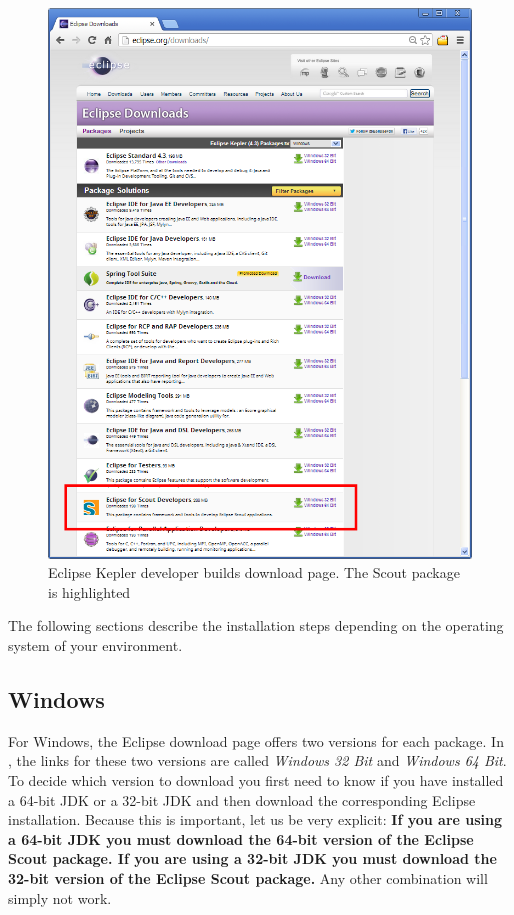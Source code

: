 \documentclass[a4paper,10pt,twoside]{book}
\begin{document}
\begin{figure}
\includegraphics[width=15cm]{scout_download.png}
\caption{Eclipse Kepler developer builds download page. The Scout package is highlighted}
\end{figure}

The following sections describe the installation steps depending on the operating system of your environment.

\subsection{Windows}

For Windows, the Eclipse download page offers two versions for each package.
In , the links for these two versions are called \textit{Windows 32 Bit} and \textit{Windows 64 Bit}.
To decide which version to download you first need to know if you have installed a 64-bit JDK or a 32-bit JDK and then download the corresponding Eclipse installation.
Because this is important, let us be very explicit: \textbf{If you are using a 64-bit JDK you must download the 64-bit version of the Eclipse Scout package. If you are using a 32-bit JDK you must download the 32-bit version of the Eclipse Scout package.}
Any other combination will simply not work.
\end{document}
